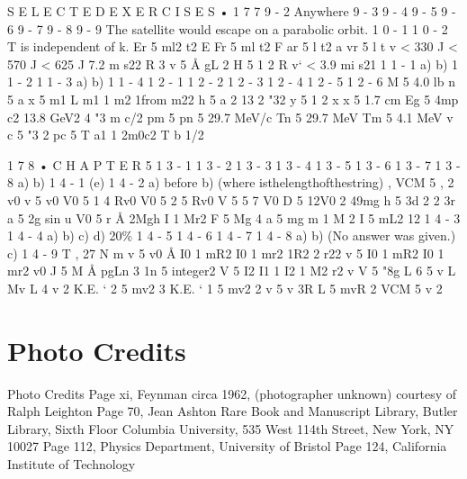 \documentclass[10pt,oneside]{article}
\begin{document}
S E L E C T E D  E X E R C I S E S • 1 7 7 9 - 2 Anywhere 9 - 3 9 - 4 9 - 5 9 - 6 9 - 7 9 - 8 9 - 9 The satellite would escape on a parabolic orbit. 1 0 - 1 1 0 - 2 T is independent of k. Er 5 ml2 t2 E Fr 5 ml t2 F ar 5 l t2 a vr 5 l t v < 330 J < 570 J < 625 J 7.2 m s22 R 3 v 5 Å gL 2 H 5 1 2 R v` < 3.9 mi s21 1 1 - 1 a) b) 1 1 - 2 1 1 - 3 a) b) 1 1 - 4 1 2 - 1 1 2 - 2 1 2 - 3 1 2 - 4 1 2 - 5 1 2 - 6 M 5 4.0 lb n 5 a x 5 m1 L m1 1 m2 1from m22 h 5 a 2 13 2 "32 y 5 1 2 x x 5 1.7 cm Eg 5 4mp c2 13.8 GeV2 4 "3 m c/2 pm 5 pn 5 29.7 MeV/c Tn 5 29.7 MeV Tm 5 4.1 MeV v c 5 "3 2 pc 5 T a1 1 2m0c2 T b 1/2\par

1 7 8 • C H A P T E R  5 1 3 - 1 1 3 - 2 1 3 - 3 1 3 - 4 1 3 - 5 1 3 - 6 1 3 - 7 1 3 - 8 a) b) 1 4 - 1 (e) 1 4 - 2 a) before b) (where isthelengthofthestring) , VCM 5 , 2 v0 v 5 v0 V0 5 1 4 Rv0 V0 5 2 5 Rv0 V 5 5 7 V0 D 5 12V0 2 49mg h 5 3d 2 2 3r a 5 2g sin u V0 5 r Å 2Mgh I 1 Mr2 F 5 Mg 4 a 5 mg m 1 M 2 I 5 mL2 12 1 4 - 3 1 4 - 4 a) b) c) d) 20\% 1 4 - 5 1 4 - 6 1 4 - 7 1 4 - 8 a) b) (No answer was given.) c) 1 4 - 9 T , 27 N m v 5 v0 Å I0 1 mR2 I0 1 mr2 1R2 2 r22 v 5 I0 1 mR2 I0 1 mr2 v0 J 5 M Å pgLn 3  1n 5 integer2 V 5 I2 I1 1 I2 1 M2 r2 v V 5 "8g L 6 5 v L Mv L 4 v 2 K.E. ` 2 5 mv2 3 K.E. ` 1 5 mv2 2 v 5 v 3R L 5 mvR 2 VCM 5 v 2\par

\clearpage
{}
\section*{Photo Credits}
\label{tips-sec-14-photo-credits}
Photo Credits Page xi, Feynman circa 1962, (photographer unknown) courtesy of Ralph Leighton Page 70, Jean Ashton Rare Book and Manuscript Library, Butler Library, Sixth Floor Columbia University, 535 West 114th Street, New York, NY 10027 Page 112, Physics Department, University of Bristol Page 124, California Institute of Technology\par

\clearpage
{}
\end{document}
